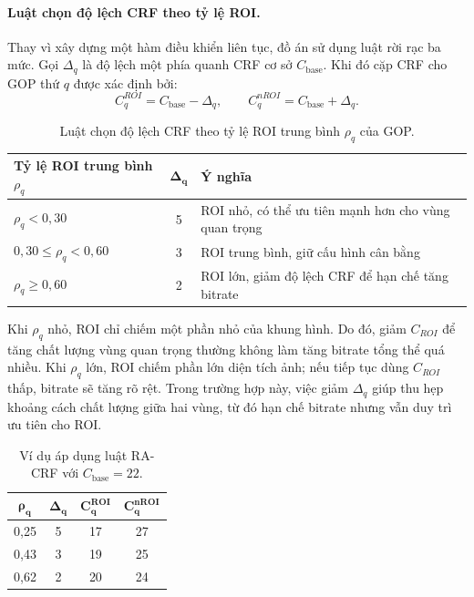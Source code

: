 \paragraph{Luật chọn độ lệch CRF theo tỷ lệ ROI.}
Thay vì xây dựng một hàm điều khiển liên tục, đồ án sử dụng luật rời rạc ba mức. Gọi $\Delta_q$ là độ lệch một phía quanh CRF cơ sở $C_{\text{base}}$. Khi đó cặp CRF cho GOP thứ $q$ được xác định bởi:
\begin{equation}
  C^{ROI}_q = C_{\text{base}} - \Delta_q,\qquad
  C^{nROI}_q = C_{\text{base}} + \Delta_q.
  \label{eq:racrf-pair}
\end{equation}

\begin{table}[H]
\centering
\caption{Luật chọn độ lệch CRF theo tỷ lệ ROI trung bình $\rho_q$ của GOP.}
\label{tab:ra-crf-rule}
\small
\begin{tabular}{p{}c p{}}
\toprule
\textbf{Tỷ lệ ROI trung bình $\rho_q$} & $\boldsymbol{\Delta_q}$ & \textbf{Ý nghĩa} \\
\midrule
$\rho_q < 0{,}30$              & 5 & ROI nhỏ, có thể ưu tiên mạnh hơn cho vùng quan trọng \\
$0{,}30 \leq \rho_q < 0{,}60$  & 3 & ROI trung bình, giữ cấu hình cân bằng \\
$\rho_q \geq 0{,}60$           & 2 & ROI lớn, giảm độ lệch CRF để hạn chế tăng bitrate \\
\bottomrule
\end{tabular}
\end{table}

Khi $\rho_q$ nhỏ, ROI chỉ chiếm một phần nhỏ của khung hình. Do đó, giảm $C_{ROI}$ để tăng chất lượng vùng quan trọng thường không làm tăng bitrate tổng thể quá nhiều. Khi $\rho_q$ lớn, ROI chiếm phần lớn diện tích ảnh; nếu tiếp tục dùng $C_{ROI}$ thấp, bitrate sẽ tăng rõ rệt. Trong trường hợp này, việc giảm $\Delta_q$ giúp thu hẹp khoảng cách chất lượng giữa hai vùng, từ đó hạn chế bitrate nhưng vẫn duy trì ưu tiên cho ROI.

\begin{table}[H]
\centering
\caption{Ví dụ áp dụng luật RA-CRF với $C_{\text{base}}=22$.}
\label{tab:ra-crf-example}
\small
\begin{tabular}{cccc}
\toprule
$\boldsymbol{\rho_q}$ & $\boldsymbol{\Delta_q}$ & $\boldsymbol{C^{ROI}_q}$ & $\boldsymbol{C^{nROI}_q}$ \\
\midrule
0,25 & 5 & 17 & 27 \\
0,43 & 3 & 19 & 25 \\
0,62 & 2 & 20 & 24 \\
\bottomrule
\end{tabular}
\end{table}

